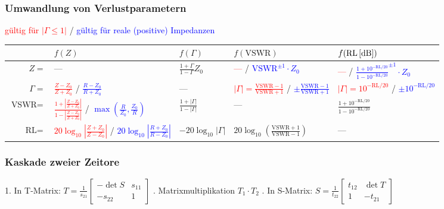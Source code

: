 \subsubsection{Umwandlung von Verlustparametern}
\textcolor{red}{gültig für
$|\Gamma\le 1|$} / \textcolor{blue}{gültig für reale (positive) Impedanzen}\\
\begin{tabular}{|r|l|l|l|l|}
\hline
     & $f(Z)$ & $f(\Gamma)$ 
              & $f(\text{VSWR})$ 
              & $f(\text{RL} \text{\,[dB]})$ \\  \hline \hline 

$Z=$ & ---    & $\frac{1+\Gamma}{1-\Gamma}Z_0$
              & \textcolor{red}{---} /
                \textcolor{blue}{$\text{VSWR}^{\pm 1}\cdot Z_0$}
              & \textcolor{red}{---} /
                \textcolor{blue}{$\frac{1+10^{-\text{RL}/20}}{1-10^{-\text{RL}/20}}^{\pm 1}\cdot Z_0$} \\ 
\hline 
$\Gamma=$ & \textcolor{red}{$\frac{Z-Z_0}{Z+Z_0}$} /
                \textcolor{blue}{$\frac{R-Z_0}{R+Z_0}$ }
                 & --- 
                 &
                 \textcolor{red}{$|\Gamma|=\frac{\text{VSWR}-1}{\text{VSWR}+1}$} /
                \textcolor{blue}{$\pm \frac{\text{VSWR}-1}{\text{VSWR}+1}$}
                 & \textcolor{red}{$|\Gamma|= 10^{-\text{RL}/20}$} /
                \textcolor{blue}{$\pm 10^{-\text{RL}/20}$} \\ 
\hline
$\text{VSWR}=$& \textcolor{red}{$\frac{1+\left|\frac{Z-Z_0}{Z+Z_0} \right|}%
                      {1-\left|\frac{Z-Z_0}{Z+Z_0} \right|}$} /
                \textcolor{blue}{$\max\left(\frac R{Z_0},\frac{Z_0}R \right)$}
              & $\frac{1+|\Gamma|}{1-|\Gamma|}$
              & ---
              & $\frac{1+10^{-\text{RL}/20}}{1-10^{-\text{RL}/20}}$ \\ 
\hline
$\text{RL}=$  & \textcolor{red}{$20\log_{10}\left|\frac{Z+Z_0}{Z-Z_0} \right|$}
/
                \textcolor{blue}{$20\log_{10}\left|\frac{R+Z_0}{R-Z_0} \right|$}
              & $-20\log_{10}\left|\Gamma \right|$
              & $20\log_{10}\left(\frac{\text{VSWR}+1}{\text{VSWR}-1} \right)$
                & --- \\ 
\hline
\end{tabular}

\subsubsection{Kaskade zweier Zeitore }
1. In T-Matrix: $T = \frac 1{s_{21}} 
  \begin{bmatrix} -\det S & s_{11} \\ -s_{22} & 1 \end{bmatrix}$ . Matrixmultiplikation $T_1 \cdot T_2$ . In S-Matrix: $S = \frac
1{t_{22}} \begin{bmatrix} t_{12} & \det T  \\ 1 & -t_{21} \end{bmatrix}$

